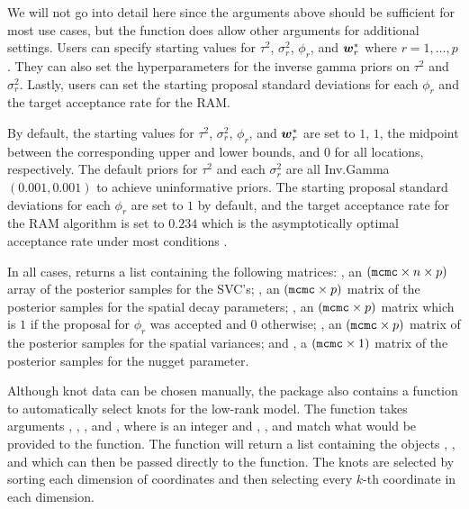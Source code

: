 We will not go into detail here since the arguments above should be sufficient for most use cases, but the  function does allow other arguments for additional settings. Users can specify starting values for $\tau^2$, $\sigma_r^2$, $\phi_r$, and $\boldsymbol{w}_r^*$ where $r = 1, \dots, p$. They can also set the hyperparameters for the inverse gamma priors on $\tau^2$ and $\sigma_r^2$. Lastly, users can set the starting proposal standard deviations for each $\phi_r$ and the target acceptance rate for the RAM.

By default, the starting values for $\tau^2$, $\sigma_r^2$, $\phi_r$, and $\boldsymbol{w}_r^*$ are set to $1$, $1$, the midpoint between the corresponding upper and lower bounds, and $0$ for all locations, respectively. The default priors for $\tau^2$ and each $\sigma_r^2$ are all Inv.Gamma$(0.001, 0.001)$ to achieve uninformative priors. The starting proposal standard deviations for each $\phi_r$ are set to $1$ by default, and the target acceptance rate for the RAM algorithm is set to $0.234$ which is the asymptotically optimal acceptance rate under most conditions \citep{gelman}.

In all cases,  returns a list containing the following matrices: , an $(\texttt{mcmc} \times n \times p)$ array of the posterior samples for the SVC's; , an $(\texttt{mcmc} \times p)$ matrix of the posterior samples for the spatial decay parameters; , an $(\texttt{mcmc} \times p)$ matrix which is $1$ if the proposal for $\phi_r$ was accepted and $0$ otherwise; , an $(\texttt{mcmc} \times p)$ matrix of the posterior samples for the spatial variances; and , a $(\texttt{mcmc} \times 1)$ matrix of the posterior samples for the nugget parameter.

Although knot data can be chosen manually, the  package also contains a function  to automatically select knots for the low-rank model. The function takes arguments , , , and , where  is an integer and , , and  match what would be provided to the  function. The function will return a list containing the objects , , and  which can then be passed directly to the  function. The knots are selected by sorting each dimension of coordinates and then selecting every $k$-th coordinate in each dimension.

